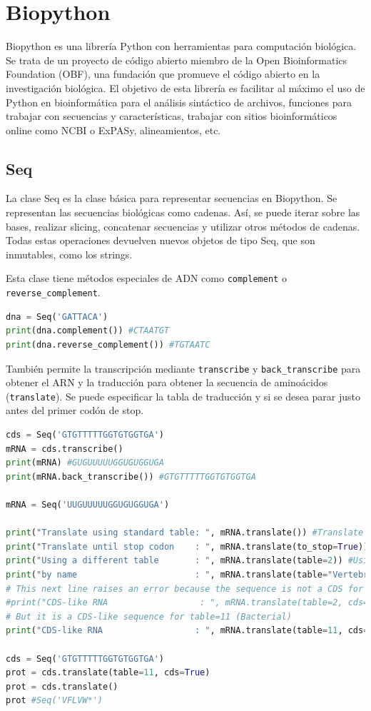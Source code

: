 \section{Biopython}
Biopython es una librería Python con herramientas para computación biológica. Se trata de un proyecto de código abierto miembro de la Open Bioinformatics Foundation (OBF), una fundación que promueve el código abierto en la investigación biológica.
El objetivo de esta librería es facilitar al máximo el uso de Python en bioinformática para el análisis sintáctico de archivos, funciones para trabajar con secuencias y características, trabajar con sitios bioinformáticos online como NCBI o ExPASy, alineamientos, etc.

\subsection{Seq}
La clase Seq es la clase básica para representar secuencias en Biopython. Se representan las secuencias biológicas como cadenas. Así, se puede iterar sobre las bases, realizar slicing, concatenar secuencias y utilizar otros métodos de cadenas. Todas estas operaciones devuelven nuevos objetos de tipo Seq, que son inmutables, como los strings.

Esta clase tiene métodos especiales de ADN como \texttt{complement} o \texttt{reverse\_complement}. 
\begin{lstlisting}[language=Python]
dna = Seq('GATTACA')
print(dna.complement()) #CTAATGT
print(dna.reverse_complement()) #TGTAATC
\end{lstlisting}

También permite la transcripción mediante \texttt{transcribe} y \texttt{back\_transcribe} para obtener el ARN y la traducción para obtener la secuencia de aminoácidos (\texttt{translate}). Se puede especificar la tabla de traducción y si se desea parar justo antes del primer codón de stop.
\begin{lstlisting}[language=Python]
cds = Seq('GTGTTTTTGGTGTGGTGA')
mRNA = cds.transcribe()
print(mRNA) #GUGUUUUUGGUGUGGUGA
print(mRNA.back_transcribe()) #GTGTTTTTGGTGTGGTGA

mRNA = Seq('UUGUUUUUGGUGUGGUGA')

print("Translate using standard table: ", mRNA.translate()) #Translate using standard table:  LFLVW*
print("Translate until stop codon    : ", mRNA.translate(to_stop=True)) #Translate until stop codon    :  LFLVW
print("Using a different table       : ", mRNA.translate(table=2)) #Using a different table       :  LFLVWW
print("by name                       : ", mRNA.translate(table="Vertebrate Mitochondrial")) #by name                       :  LFLVWW
# This next line raises an error because the sequence is not a CDS for table=2
#print("CDS-like RNA                  : ", mRNA.translate(table=2, cds=True)) #CDS-like RNA                  :  MFLVW
# But it is a CDS-like sequence for table=11 (Bacterial)
print("CDS-like RNA                  : ", mRNA.translate(table=11, cds=True)) #CDS-like RNA                  :  MFLVW

cds = Seq('GTGTTTTTGGTGTGGTGA')
prot = cds.translate(table=11, cds=True)
prot = cds.translate()
prot #Seq('VFLVW*')
\end{lstlisting}

